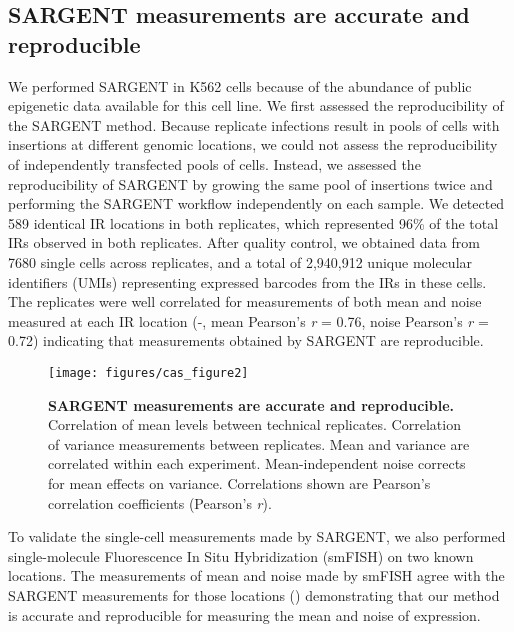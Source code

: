 \subsection{SARGENT measurements are accurate and reproducible}

We performed SARGENT in K562 cells because of the abundance of public epigenetic data available for this cell line. We first assessed the reproducibility of the SARGENT method. Because replicate infections result in pools of cells with insertions at different genomic locations, we could not assess the reproducibility of independently transfected pools of cells. Instead, we assessed the reproducibility of SARGENT by growing the same pool of insertions twice and performing the SARGENT workflow independently on each sample. We detected 589 identical IR locations in both replicates, which represented 96\% of the total IRs observed in both replicates. After quality control, we obtained data from 7680 single cells across replicates, and a total of 2,940,912 unique molecular identifiers (UMIs) representing expressed barcodes from the IRs in these cells. The replicates were well correlated for measurements of both mean and noise measured at each IR location (-, mean Pearson’s \textit{r} = 0.76, noise Pearson’s \textit{r} = 0.72) indicating that measurements obtained by SARGENT are reproducible.

\begin{figure}[tb]  
    \centering
    \texttt{[image: figures/cas\_figure2]}
    \caption[SARGENT measurements are accurate and reproducible.]{%
        \textbf{SARGENT measurements are accurate and reproducible.}
        Correlation of mean levels between technical replicates.
        Correlation of variance measurements between replicates.
        Mean and variance are correlated within each experiment.
        Mean-independent noise corrects for mean effects on variance. Correlations shown are Pearson’s correlation coefficients (Pearson’s \textit{r}). 
    }
    \label{fig:cas_figure2}
\end{figure}

To validate the single-cell measurements made by SARGENT, we also performed single-molecule Fluorescence In Situ Hybridization (smFISH) on two known locations. The measurements of mean and noise made by smFISH agree with the SARGENT measurements for those locations () demonstrating that our method is accurate and reproducible for measuring the mean and noise of expression. 

